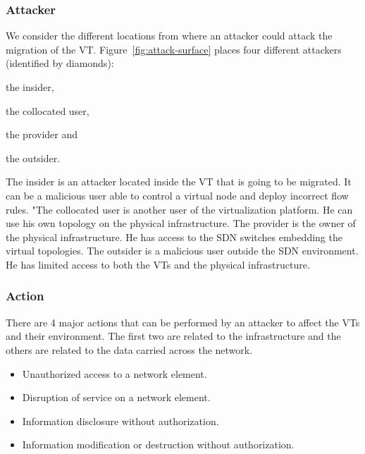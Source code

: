 \subsubsection{Attacker}
We consider the different locations from where an attacker could attack the migration of the VT. 
Figure~\ref{fig:attack-surface} places four different attackers (identified by diamonds): 
\begin{inparaenum}[(1)] 
\item the insider, 
\item the collocated user, 
\item the provider and
\item the outsider.
\end{inparaenum}
The insider is an attacker located inside the VT that is going to be migrated.
It can be a malicious user able to control a virtual node and deploy incorrect flow rules.
"The collocated user is another user of the virtualization platform.
He can use his own topology on the physical infrastructure.
The provider is the owner of the physical infrastructure.
He has access to the SDN switches embedding the virtual topologies.
The outsider is a malicious user outside the SDN environment.
He has limited access to both the VTs and the physical infrastructure.

\subsubsection{Action}
There are 4 major actions that can be performed by an attacker to affect the VTs and their environment.
The first two are related to the infrastructure and the others are related to the data carried across the network.
\begin{itemize}
\item Unauthorized access to a network element.
\item Disruption of service on a network element.
\item Information disclosure without authorization.
\item Information modification or destruction without authorization.
\end{itemize}

